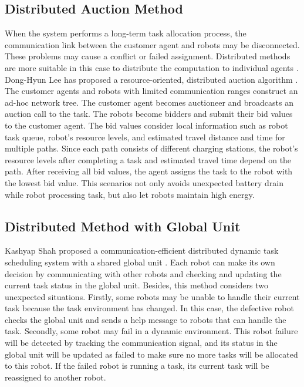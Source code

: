 \subsection{Distributed Auction Method}
\label{sec:auction_method}
When the system performs a long-term task allocation process, the communication link between the customer agent and robots may be disconnected. These problems may cause a conflict or failed assignment. 
Distributed methods are more suitable in this case to distribute the computation to individual agents \cite{NUNES201755}. 
Dong-Hyun Lee has proposed a resource-oriented, distributed auction algorithm \cite{Dong2015}. The customer agents and robots with limited communication ranges construct an ad-hoc network tree. The customer agent becomes auctioneer and broadcasts an auction call to the task. The robots become bidders and submit their bid values to the customer agent. The bid values consider local information such as robot task queue, robot's resource levels, and estimated travel distance and time for multiple paths. Since each path consists of different charging stations, the robot's resource levels after completing a task and estimated travel time depend on the path. After receiving all bid values, the agent assigns the task to the robot with the lowest bid value. This scenarios not only avoids unexpected battery drain while robot processing task, but also let robots maintain high energy.

\subsection{Distributed Method with Global Unit}
\label{sec:global_unit_method}
Kashyap Shah proposed a communication-efficient distributed dynamic task scheduling system with a shared global unit \cite{Shah7}. Each robot can make its own decision by communicating with other robots and checking and updating the current task status in the global unit. Besides, this method considers two unexpected situations. 
Firstly, some robots may be unable to handle their current task because the task environment has changed. In this case, the defective robot checks the global unit and sends a help message to robots that can handle the task. Secondly, some robot may fail in a dynamic environment. This robot failure will be detected by tracking the communication signal, and its status in the global unit will be updated as failed to make sure no more tasks will be allocated to this robot. If the failed robot is running a task, its current task will be reassigned to another robot. 


